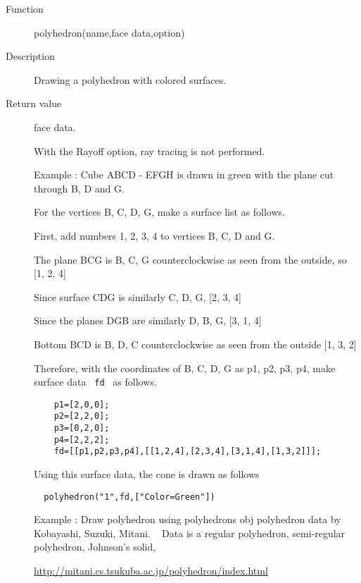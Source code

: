 \documentclass[papersize,a4paper,12pt]{article}
\begin{document}
\begin{description}

\hypertarget{polyhedron}{}
\item[Function] polyhedron(name,face data,option)
\item[Description] Drawing a polyhedron with colored surfaces.
\item[Return value] face data.

With the Rayoff option, ray tracing is not performed.
 
\vspace{\baselineskip}
 Example : Cube ABCD - EFGH is drawn in green with the plane cut through B, D and G.

\hspace{30mm} 

For the vertices B, C, D, G, make a surface list as follows.
   
First, add numbers 1, 2, 3, 4 to vertices B, C, D and G.
   
The plane BCG is B, C, G counterclockwise as seen from the outside, so [1, 2, 4]
   
Since surface CDG is similarly C, D, G, [2, 3, 4]
   
Since the planes DGB are similarly D, B, G, [3, 1, 4]
   
Bottom BCD is B, D, C counterclockwise as seen from the outside [1, 3, 2]
   
  Therefore, with the coordinates of B, C, D, G as p1, p2, p3, p4, make surface data \verb | fd | as follows.

\begin{verbatim}
    p1=[2,0,0]; 
    p2=[2,2,0]; 
    p3=[0,2,0]; 
    p4=[2,2,2]; 
    fd=[[p1,p2,p3,p4],[[1,2,4],[2,3,4],[3,1,4],[1,3,2]]];
\end{verbatim}

Using this surface data, the cone is drawn as follows

 \verb|  polyhedron("1",fd,["Color=Green"])|
    
\hspace{30mm} 

Example : Draw polyhedron using polyhedrons obj polyhedron data by Kobayashi, Suzuki, Mitani.
  Data is a regular polyhedron, semi-regular polyhedron, Johnson's solid,
 
\url{http://mitani.cs.tsukuba.ac.jp/polyhedron/index.html }
 

\end{description}
\end{document}
